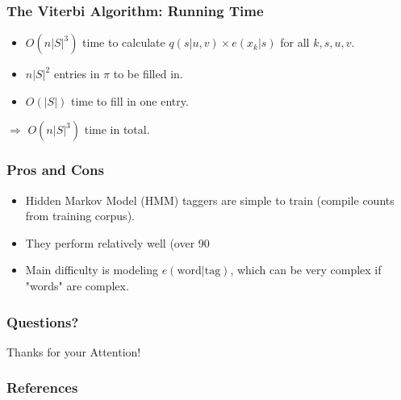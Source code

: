 \documentclass[handout]{beamer}
\begin{document}
\begin{frame}
  \frametitle{The Viterbi Algorithm: Running Time}
  \begin{itemize}
    \item $O(n|S|^3)$ time to calculate $q(s|u, v) \times e(x_k|s)$ for all $k, s, u, v$.
    \item $n|S|^2$ entries in $\pi$ to be filled in.
    \item $O(|S|)$ time to fill in one entry.
  \end{itemize}
  $\Rightarrow$ $O(n|S|^3)$ time in total.
\end{frame}

\begin{frame}
  \frametitle{Pros and Cons}
  \begin{itemize}
    \item Hidden Markov Model (HMM) taggers are simple to train (compile counts from training corpus).
    \item They perform relatively well (over 90%
    \item Main difficulty is modeling $e(\text{word} | \text{tag})$, which can be very complex if "words" are complex.
  \end{itemize}
\end{frame}


\begin{frame}
\frametitle{Questions?}
\begin{center}\LARGE Thanks for your Attention!\\ \end{center}



\end{frame}

\begin{frame}[allowframebreaks]\scriptsize
\frametitle{References}


%
\end{frame}  


\end{document}
